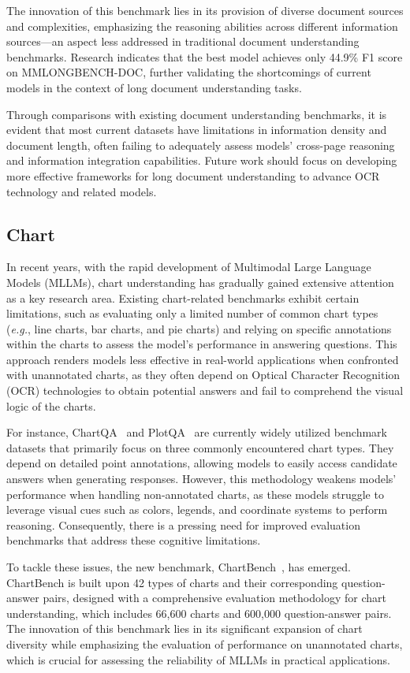 The innovation of this benchmark lies in its provision of diverse document sources and complexities, emphasizing the reasoning abilities across different information sources—an aspect less addressed in traditional document understanding benchmarks. Research indicates that the best model achieves only 44.9\% F1 score on MMLONGBENCH-DOC, further validating the shortcomings of current models in the context of long document understanding tasks.

Through comparisons with existing document understanding benchmarks, it is evident that most current datasets have limitations in information density and document length, often failing to adequately assess models' cross-page reasoning and information integration capabilities. Future work should focus on developing more effective frameworks for long document understanding to advance OCR technology and related models.
\subsection{Chart}
In recent years, with the rapid development of Multimodal Large Language Models (MLLMs), chart understanding has gradually gained extensive attention as a key research area. Existing chart-related benchmarks exhibit certain limitations, such as evaluating only a limited number of common chart types (\emph{e.g.}, line charts, bar charts, and pie charts) and relying on specific annotations within the charts to assess the model's performance in answering questions. This approach renders models less effective in real-world applications when confronted with unannotated charts, as they often depend on Optical Character Recognition (OCR) technologies to obtain potential answers and fail to comprehend the visual logic of the charts.

For instance, ChartQA~\cite{masry2022chartqa} and PlotQA~\cite{methani2020plotqa} are currently widely utilized benchmark datasets that primarily focus on three commonly encountered chart types. They depend on detailed point annotations, allowing models to easily access candidate answers when generating responses. However, this methodology weakens models' performance when handling non-annotated charts, as these models struggle to leverage visual cues such as colors, legends, and coordinate systems to perform reasoning. Consequently, there is a pressing need for improved evaluation benchmarks that address these cognitive limitations.

To tackle these issues, the new benchmark, ChartBench~\cite{Xu2024ARXIV_ChartBench_A_Benchmark}, has emerged. ChartBench is built upon 42 types of charts and their corresponding question-answer pairs, designed with a comprehensive evaluation methodology for chart understanding, which includes 66,600 charts and 600,000 question-answer pairs. The innovation of this benchmark lies in its significant expansion of chart diversity while emphasizing the evaluation of performance on unannotated charts, which is crucial for assessing the reliability of MLLMs in practical applications.

